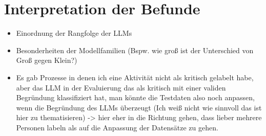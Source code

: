 \section{Interpretation der Befunde}\label{sec:interpretation-der-befunde}

\begin{itemize}
    \item Einordnung der Rangfolge der LLMs
    \item Besonderheiten der Modellfamilien (Bspw. wie groß ist der Unterschied von Groß gegen Klein?)
    \item Es gab Prozesse in denen ich eine Aktivität nicht als kritisch gelabelt habe, aber das LLM in der Evaluierung das als kritisch mit einer validen Begründung klassifiziert hat, man könnte die Testdaten also noch anpassen, wenn die Begründung des LLMs überzeugt (Ich weiß nicht wie sinnvoll das ist hier zu thematisieren) -> hier eher in die Richtung gehen, dass lieber mehrere Personen labeln als auf die Anpassung der Datensätze zu gehen.
\end{itemize}